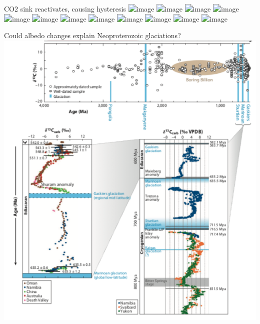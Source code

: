 \documentclass[11pt,handout]{beamer}
\begin{document}
\begin{frame}{CO2 sink reactivates, causing hysteresis}
    \centering
    \includegraphics<1 >[width=.9\textwidth,height=.9\textheight,keepaspectratio]{img/Bback_0.png}
    \includegraphics<2 >[width=.9\textwidth,height=.9\textheight,keepaspectratio]{img/Bback_1.png}
    \includegraphics<3 >[width=.9\textwidth,height=.9\textheight,keepaspectratio]{img/Bback_2.png}
    \includegraphics<4 >[width=.9\textwidth,height=.9\textheight,keepaspectratio]{img/Bback_3.png}
    \includegraphics<5 >[width=.9\textwidth,height=.9\textheight,keepaspectratio]{img/Bback_4.png}
    \includegraphics<6 >[width=.9\textwidth,height=.9\textheight,keepaspectratio]{img/Bback_5.png}
    \includegraphics<7 >[width=.9\textwidth,height=.9\textheight,keepaspectratio]{img/Bfor_0.png}
    \includegraphics<8 >[width=.9\textwidth,height=.9\textheight,keepaspectratio]{img/Bfor_1.png}
    \includegraphics<9 >[width=.9\textwidth,height=.9\textheight,keepaspectratio]{img/Bfor_2.png}
    \includegraphics<10>[width=.9\textwidth,height=.9\textheight,keepaspectratio]{img/Bfor_3.png}
    \includegraphics<11>[width=.9\textwidth,height=.9\textheight,keepaspectratio]{img/Bfor_4.png}
    \includegraphics<12>[width=.9\textwidth,height=.9\textheight,keepaspectratio]{img/Bfor_5.png}
\end{frame}

\begin{frame}{Could albedo changes explain Neoproterozoic glaciations?}
    \centering
    \includegraphics[width=.9\textwidth,height=.9\textheight,keepaspectratio]{img/pierrehumbert.png}
\end{frame}
\end{document}

